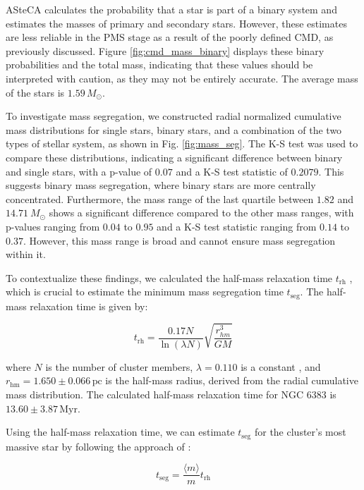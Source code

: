 \documentclass{aa}
\begin{document}
ASteCA calculates the probability that a star is part of a binary system and estimates the masses of primary and secondary stars. However, these estimates are less reliable in the PMS stage as a result of the poorly defined CMD, as previously discussed. Figure \ref{fig:cmd_mass_binary} displays these binary probabilities and the total mass, indicating that these values should be interpreted with caution, as they may not be entirely accurate. The average mass of the stars is $1.59\,M_\odot$. 

To investigate mass segregation, we constructed radial normalized cumulative mass distributions for single stars, binary stars, and a combination of the two types of stellar system, as shown in Fig. \ref{fig:mass_seg}. The K-S test was used to compare these distributions, indicating a significant difference between binary and single stars, with a p-value of $0.07$ and a K-S test statistic of $0.2079$. This suggests binary mass segregation, where binary stars are more centrally concentrated. Furthermore, the mass range of the last quartile between $1.82$ and $14.71~M_\odot$ shows a significant difference compared to the other mass ranges, with p-values ranging from $0.04$ to $0.95$ and a K-S test statistic ranging from $0.14$ to $0.37$. However, this mass range is broad and cannot ensure mass segregation within it.

To contextualize these findings, we calculated the half-mass relaxation time $t_{\mathrm{rh}}$ \citep{1969ApJ...158L.139S}, which is crucial to estimate the minimum mass segregation time $t_{\mathrm{seg}}$. The half-mass relaxation time is given by:

\begin{equation}
t_{\mathrm{rh}} = \frac{0.17N}{\ln(\lambda N)}\sqrt{\frac{r_{hm}^3}{GM}}
\end{equation}

where $N$ is the number of cluster members, $\lambda = 0.110$ is a constant \citep{1994MNRAS.268..257G}, and $r_\mathrm{hm} = 1.650 \pm 0.066\,\mathrm{pc}$ is the half-mass radius, derived from the radial cumulative mass distribution. The calculated half-mass relaxation time for NGC 6383 is $13.60\pm 3.87\,\mathrm{Myr}$.

Using the half-mass relaxation time, we can estimate $t_{\mathrm{seg}}$ for the cluster's most massive star by following the approach of \citet{1969ApJ...158L.139S}:

\begin{equation}
t_{\mathrm{seg}} = \frac{\langle m \rangle}{m} t_{\mathrm{rh}}
\end{equation}
\end{document}
